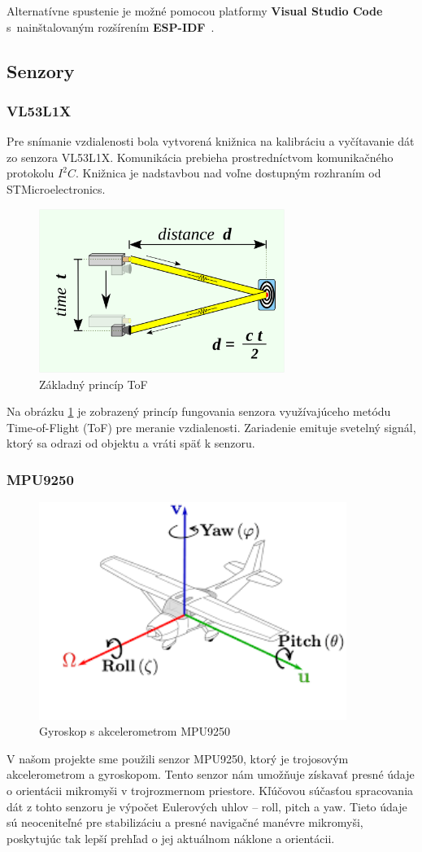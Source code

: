 Alternatívne spustenie je možné pomocou platformy \textbf{Visual Studio Code} s~nainštalovaným rozšírením
\textbf{ESP-IDF}~\cite{espIDF}.
\newpage
\subsection{Senzory}
\label{subsec:senzory}
\subsubsection{VL53L1X}
Pre snímanie vzdialenosti bola vytvorená knižnica na kalibráciu a vyčítavanie dát zo senzora VL53L1X. Komunikácia prebieha prostredníctvom komunikačného protokolu $I^2 C$. Knižnica je nadstavbou nad voľne dostupným rozhraním od STMicroelectronics.
\begin{figure}[!htpb]
	\centering
	\includegraphics[width=8cm]{includes//images/tof_pic.png}
	\caption{Základný princíp ToF}
	\label{fig:tof_pic}
\end{figure}
Na obrázku \ref{fig:tof_pic} je zobrazený princíp fungovania senzora využívajúceho metódu Time-of-Flight (ToF) pre meranie vzdialenosti. Zariadenie emituje svetelný signál, ktorý sa odrazi od objektu a vráti späť k senzoru.
\subsubsection{MPU9250}
\begin{figure}[!htpb]
	\centering
	\includegraphics[width=10cm]{includes//images/rpy.png}
	\caption{Gyroskop s akcelerometrom MPU9250 }
	\label{fig:rpy}
\end{figure}
V našom projekte sme použili senzor MPU9250, ktorý je trojosovým akcelerometrom a gyroskopom. Tento senzor nám umožňuje získavať presné údaje o orientácii mikromyši v trojrozmernom priestore. Kľúčovou súčasťou spracovania dát z tohto senzoru je výpočet Eulerových uhlov -- roll, pitch a yaw. Tieto údaje sú neoceniteľné pre stabilizáciu a presné navigačné manévre mikromyši, poskytujúc tak lepší prehľad o jej aktuálnom náklone a orientácii.

